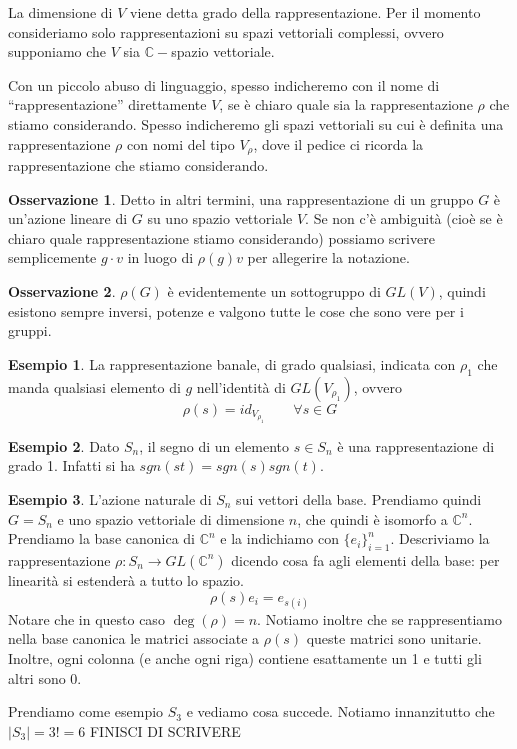 \documentclass[11pt]{article}
\theoremstyle{plain}
\theoremstyle{definition}
\newtheorem{exmp}{Esempio}[section]
\newtheorem*{rem}{Osservazione}
\theoremstyle{remark}
\newcommand{\C}{\mathbb{C}}
\begin{document}
La dimensione di $V$ viene detta grado della rappresentazione.
Per il momento consideriamo solo rappresentazioni su spazi vettoriali complessi, ovvero supponiamo che $V$ sia $\C-$spazio vettoriale.

Con un piccolo abuso di linguaggio, spesso indicheremo con il nome di ``rappresentazione'' direttamente $V$, se è chiaro quale sia 
la rappresentazione $\rho$ che stiamo considerando. Spesso indicheremo gli spazi vettoriali
su cui è definita una rappresentazione $\rho$ con nomi del tipo $V_\rho$, dove il pedice ci ricorda la rappresentazione che stiamo considerando.

\begin{rem}
Detto in altri termini, una rappresentazione di un gruppo $G$ è un'azione lineare di $G$ su uno spazio vettoriale $V$.
Se non c'è ambiguità (cioè se è chiaro quale rappresentazione stiamo considerando)
possiamo scrivere semplicemente $g\cdot v$ in luogo di $\rho(g)v$ per allegerire la notazione.
\end{rem}

\begin{rem}
$\rho(G)$ è evidentemente un sottogruppo di $GL(V)$, quindi esistono sempre inversi, potenze e valgono tutte le cose che sono vere per i gruppi.
\end{rem}


\begin{exmp}
   La rappresentazione banale, di grado qualsiasi, indicata con $\rho_1$ che manda qualsiasi elemento di $g$ nell'identità di $GL(V_{\rho_1})$, ovvero
	\[ \rho(s ) = id_{V_{\rho_1}} \qquad \forall s \in G\]
\end{exmp}
\begin{exmp}
   Dato $S_n$, il segno di un elemento $s\in S_n$ è una rappresentazione di grado 1. Infatti si ha $sgn(st) = sgn(s) sgn(t)$.
\end{exmp}
\begin{exmp}
   L'azione naturale di $S_n$ sui vettori della base. Prendiamo quindi $G = S_n$ e uno spazio vettoriale di dimensione $n$, che quindi è isomorfo a $\C^n$. Prendiamo la base canonica di $\C^n$ e la indichiamo con $\{e_i\}_{i=1}^n$. Descriviamo la rappresentazione $\rho: S_n \to GL(\C^n)$ dicendo cosa fa agli elementi della base: per linearità si estenderà a tutto lo spazio.
	\[ \rho(s) e_i = e_{s(i)}\]
	Notare che in questo caso $\deg(\rho) = n$. Notiamo inoltre che se rappresentiamo nella base canonica le matrici associate a $\rho(s)$ queste matrici sono unitarie. Inoltre, ogni colonna (e anche ogni riga) contiene esattamente un 1 e tutti gli altri sono 0.
	
	Prendiamo come esempio $S_3$ e vediamo cosa succede. Notiamo innanzitutto che $ |S_3| = 3! = 6$
	FINISCI DI SCRIVERE
\end{exmp}
\end{document}
